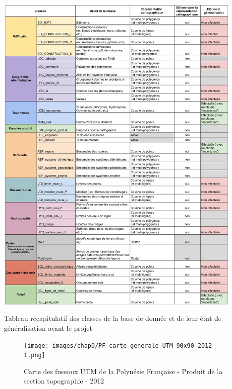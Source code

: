 \documentclass{themeensg}
\begin{document}
\begin{appendices}
\begin{table}[!h]

\begin{center}
    \includegraphics[width=11.95cm]{images/Annexes/table.jpg}%
    \label{fig:graphics:b}%
    \caption{Tableau récapitulatif des classes de la base de donnée et de leur état de généralisation avant le projet}
\end{center}

\end{table}


\label{annexefuseau}


\begin{figure}[!h]
\centering
\texttt{[image: images/chap0/PF\_carte\_generale\_UTM\_90x90\_2012-1.png]}
\caption{Carte des fuseaux UTM de la Polynésie Française - Produit de la section topographie - 2012}
\label{fuseauUTM}
\end{figure}




\end{appendices}
\end{document}
